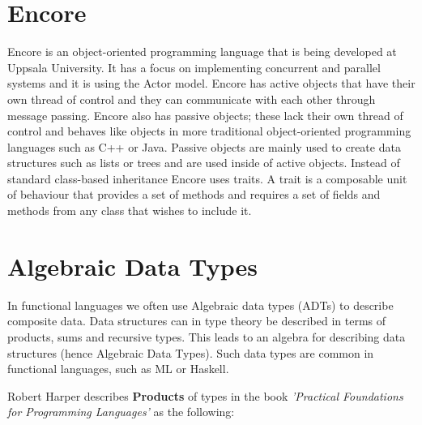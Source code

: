 \documentclass[10pt]{report}
\begin{document}
%
\label{ch:background}
%

\section{Encore}
\par{Encore is an object-oriented programming language that is being developed at Uppsala University\cite{Encore}. It has a focus on implementing concurrent and parallel systems and it is using the Actor model. Encore has active objects that have their own thread of control and they can communicate with each other through message passing. Encore also has passive objects; these lack their own thread of control and behaves like objects in more traditional object-oriented programming languages such as C++ or Java. Passive objects are mainly used to create data structures such as lists or trees and are used inside of active objects. Instead of standard class-based inheritance Encore uses traits.  A trait is a composable unit of behaviour that provides a set of methods and requires a set of fields and methods from any class that wishes to include it.} %
\section{Algebraic Data Types}
\par{In functional languages we often use Algebraic data types (ADTs) to describe composite data. Data structures can in type theory be described in terms of products, sums and recursive types. This leads to an algebra for describing data structures (hence Algebraic Data Types). Such data types are common in functional languages, such as ML or Haskell.}

\par{Robert Harper describes \textbf{Products} of types in the book \textit{'Practical Foundations for Programming Languages'} as the following:}
\end{document}
